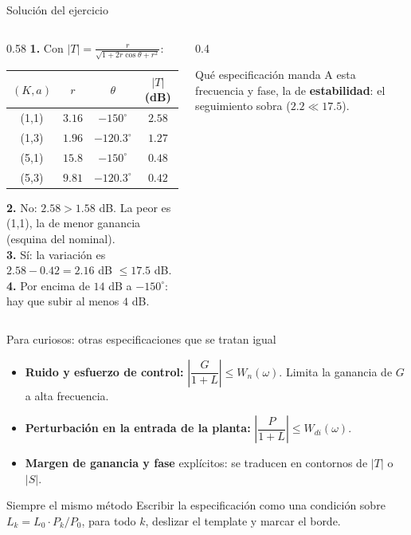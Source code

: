 \documentclass[aspectratio=169,11pt]{beamer}
\begin{document}
\begin{frame}{Solución del ejercicio}
  \footnotesize
  \begin{columns}[T]
  \begin{column}{0.58\textwidth}
    \textbf{1.} Con $|T|=\frac{r}{\sqrt{1+2r\cos\theta+r^2}}$:
    \begin{center}
    \begin{tabular}{c|c|c|c}
      $(K,a)$ & $r$ & $\theta$ & $|T|$ (dB)\\\hline
      (1,1) & $3.16$ & $-150^\circ$ & $2.58$\\
      (1,3) & $1.96$ & $-120.3^\circ$ & $1.27$\\
      (5,1) & $15.8$ & $-150^\circ$ & $0.48$\\
      (5,3) & $9.81$ & $-120.3^\circ$ & $0.42$
    \end{tabular}
    \end{center}
    \textbf{2.} No: $2.58>1.58$ dB. La peor es (1,1), la de menor ganancia (esquina del nominal).\\[2pt]
    \textbf{3.} Sí: la variación es $2.58-0.42=2.16$ dB $\le17.5$ dB.\\[2pt]
    \textbf{4.} Por encima de $14$ dB a $-150^\circ$: hay que subir al menos $4$ dB.
  \end{column}
  \begin{column}{0.4\textwidth}
    \begin{block}{Qué especificación manda}
      A esta frecuencia y fase, la de \textbf{estabilidad}: el seguimiento sobra ($2.2\ll17.5$).
    \end{block}
  \end{column}
  \end{columns}
\end{frame}

\begin{frame}{Para curiosos: otras especificaciones que se tratan igual}
  \small
  \begin{itemize}
    \item \textbf{Ruido y esfuerzo de control:} $\left|\dfrac{G}{1+L}\right|\le W_n(\omega)$. Limita la ganancia de $G$ a alta frecuencia.
    \item \textbf{Perturbación en la entrada de la planta:} $\left|\dfrac{P}{1+L}\right|\le W_{di}(\omega)$.
    \item \textbf{Margen de ganancia y fase} explícitos: se traducen en contornos de $|T|$ o $|S|$.
  \end{itemize}
  \begin{block}{Siempre el mismo método}
    Escribir la especificación como una condición sobre $L_k=L_0\cdot P_k/P_0$, para todo $k$, deslizar el template y marcar el borde.
  \end{block}
\end{frame}
\end{document}
